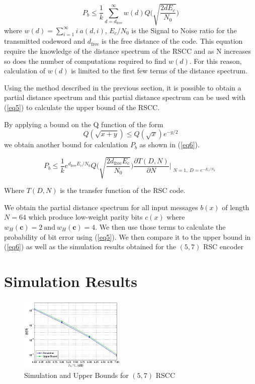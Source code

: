 \documentclass[conference]{IEEEtran}
\begin{document}
\begin{equation}
P_b \leq \frac{1}{k} \sum_{d=d_{\text{free}}}^{\infty} w(d) Q\Bigg( \sqrt{\frac{2dE_c}{N_0}}\Bigg)
\label{eq5}
\end{equation}
where $w(d)=\sum_{i=1}^{\infty} i~ a(d,i)$, $E_c/N_0$ is the Signal to Noise ratio for the transmitted codeword and $d_{\text{free}}$ is the free distance of the code. This equation require the knowledge of the distance spectrum of the RSCC and as N increases so does the number of computations required to find $w(d)$. For this reason, calculation of $w(d)$ is limited to the first few terms of the distance spectrum. 

Using the method described in the previous section, it is possible to obtain a partial distance spectrum and this partial distance spectrum can be used with (\ref{eq5}) to calculate the upper bound of the RSCC. 

By applying a bound on the Q function of the form $$Q(\sqrt{x+y}) \leq Q(\sqrt{x})e^{-y/2}$$ we obtain another bound for calculation $P_b$ as shown in (\ref{eq6}).

\begin{equation}
P_b \leq  \frac{1}{k} e^{d_{\text{free}}E_c/N_0}Q\Bigg( \sqrt{\frac{2d_{\text{free}}E_c}{N_0}}\Bigg) \frac{\partial T(D,N)}{\partial N}\Bigr|_{\substack{N=1,~D=e^{-E_c/N_0}}}
\label{eq6}
\end{equation}

Where  $T(D,N)$ is the transfer function of the RSC code. 

We obtain the partial distance spectrum for all input messages $b(x)$ of length $N=64$ which produce low-weight parity bits
$c(x)$ where $w_H(\textbf{c})=2 ~\text{and} ~ w_H(\textbf{c})=4$. We then use those terms to calculate the probability of bit error using (\ref{eq5}). We then compare it to the upper bound in (\ref{eq6}) as well as the simulation results obtained for the $(5,7)$ RSC encoder
\section{Simulation Results}
\label{sec5}

\begin{figure}[h]
\centering
		\includegraphics[width=0.45\textwidth]{paperg2.png}
		\caption{Simulation and Upper Bounds for $(5,7)$ RSCC}
		\label{fig3}
		\end{figure}
		
\end{document}
